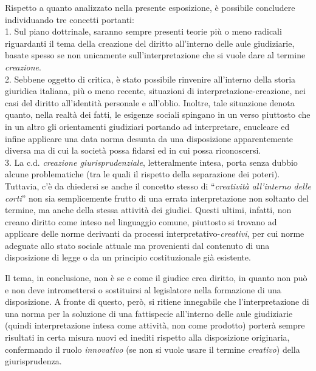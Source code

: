 Rispetto a quanto analizzato nella presente esposizione, è possibile concludere individuando tre concetti portanti:
\\1.	Sul piano dottrinale, saranno sempre presenti teorie più o meno radicali riguardanti il tema della creazione del diritto all’interno delle aule giudiziarie, basate spesso se non unicamente sull’interpretazione che si vuole dare al termine \textit{creazione}.
\\2.	Sebbene oggetto di critica, è stato possibile rinvenire all’interno della storia giuridica italiana, più o meno recente, situazioni di interpretazione-creazione, nei casi del diritto all’identità personale e all’oblio. 
Inoltre, tale situazione denota quanto, nella realtà dei fatti, le esigenze sociali spingano in un verso piuttosto che in un altro gli orientamenti giudiziari portando ad interpretare, enucleare ed infine applicare una data norma desunta da una disposizione apparentemente diversa ma di cui la società possa fidarsi ed in cui possa riconoscersi.
\\3.	La c.d. \textit{creazione giurisprudenziale}, letteralmente intesa, porta senza dubbio alcune problematiche (tra le quali il rispetto della separazione dei poteri). 
Tuttavia, c’è da chiedersi se anche il concetto stesso di “\textit{creatività all’interno delle corti}” non sia semplicemente frutto di una errata interpretazione non soltanto del termine, ma anche della stessa attività dei giudici.
Questi ultimi, infatti, non creano diritto come inteso nel linguaggio comune, piuttosto si trovano ad applicare delle norme derivanti da processi interpretativo-\textit{creativi}, per cui norme adeguate allo stato sociale attuale ma provenienti dal contenuto di una disposizione di legge o da un principio costituzionale già esistente.

Il tema, in conclusione, non è se e come il giudice crea diritto, in quanto non può e non deve intromettersi o sostituirsi al legislatore nella formazione di una disposizione. A fronte di questo, però, si ritiene innegabile che l’interpretazione di una norma per la soluzione di una fattispecie all’interno delle aule giudiziarie (quindi interpretazione intesa come attività, non come prodotto) porterà sempre risultati in certa misura nuovi ed inediti rispetto alla disposizione originaria, confermando il ruolo \textit{innovativo} (se non si vuole usare il termine \textit{creativo}) della giurisprudenza.

